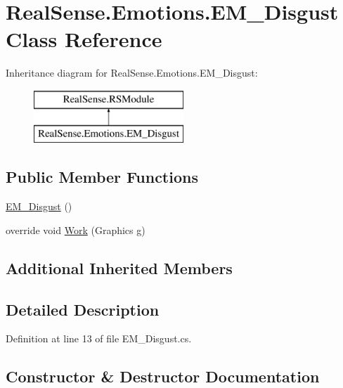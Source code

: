 \hypertarget{class_real_sense_1_1_emotions_1_1_e_m___disgust}{}\section{Real\+Sense.\+Emotions.\+E\+M\+\_\+\+Disgust Class Reference}
\label{class_real_sense_1_1_emotions_1_1_e_m___disgust}
Inheritance diagram for Real\+Sense.\+Emotions.\+E\+M\+\_\+\+Disgust\+:\begin{figure}[H]
\begin{center}
\leavevmode
\includegraphics[height=2.000000cm]{class_real_sense_1_1_emotions_1_1_e_m___disgust}
\end{center}
\end{figure}
\subsection*{Public Member Functions}
\begin{DoxyCompactItemize}
\item 
\hyperlink{class_real_sense_1_1_emotions_1_1_e_m___disgust_aba892f265a554ffe99c81482b48fbed0}{E\+M\+\_\+\+Disgust} ()
\item 
override void \hyperlink{class_real_sense_1_1_emotions_1_1_e_m___disgust_a22cbe3025c32821d53edcb325140ccb1}{Work} (Graphics g)
\end{DoxyCompactItemize}
\subsection*{Additional Inherited Members}


\subsection{Detailed Description}


Definition at line 13 of file E\+M\+\_\+\+Disgust.\+cs.



\subsection{Constructor \& Destructor Documentation}
\mbox{\label{class_real_sense_1_1_emotions_1_1_e_m___disgust_aba892f265a554ffe99c81482b48fbed0}} 
